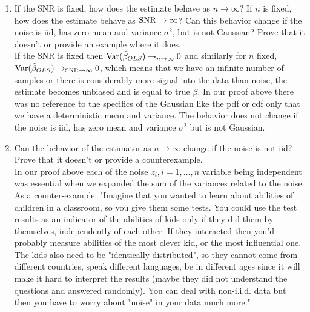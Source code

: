 \documentclass[12pt,twoside]{article}
\begin{document}
\begin{enumerate}
\begin{enumerate}
  \item If the SNR is fixed, how does the estimate behave as $n \rightarrow \infty$? If $n$ is fixed, how does the estimate behave as $\operatorname{SNR} \rightarrow \infty$? Can this behavior change if the noise is iid, has zero mean and variance $\sigma^2$, but is not Gaussian? Prove that it doesn't or provide an example where it does.\\
  
  \medskip
If the SNR is fixed then $\mathrm{Var}{(\tilde{ \beta }_{OLS})} \rightarrow_{n \rightarrow \infty} 0$ and similarly for $n$ fixed, $\mathrm{Var}{(\tilde{ \beta }_{OLS})} \rightarrow_{\operatorname{SNR}\rightarrow \infty} 0$, which means that we have an infinite number of samples or there is considerably more signal into the data than noise, the estimate becomes unbiased and is equal to true $\beta$. In our proof above there was no reference to the specifics of the Gaussian like the pdf or cdf only that we have a deterministic mean and variance. The behavior does not change if the noise is iid, has zero mean and variance $\sigma^2$ but is not Gaussian.
  \medskip

  \item Can the behavior of the estimator as $n \rightarrow \infty$ change if the noise is not iid? Prove that it doesn't or provide a counterexample.\\
  
  \medskip
  In our proof above each of the noise $z_i, i=1, \ldots, n$ variable being independent was essential when we expanded the sum of the variances related to the noise.
   As a counter-example:
  "Imagine that you wanted to learn about abilities of children in a classroom, so you give them some tests. 
  You could use the test results as an indicator of the abilities of kids only if they did them by themselves, independently of each other. 
  If they interacted then you'd probably measure abilities of the most clever kid, or the most influential one.
  The kids also need to be "identically distributed", so they cannot come from different countries, speak different languages, be in different ages since it will make it hard to interpret the results
   (maybe they did not understand the questions and answered randomly). You can deal with non-i.i.d. data but then you have to worry about "noise" in your data much more."

  
  
  \end{enumerate} 
   
 \newpage
 

\end{enumerate}
\end{document}

